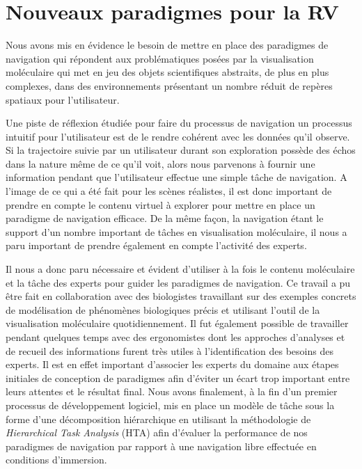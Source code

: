 \section{Nouveaux paradigmes pour la RV}

Nous avons mis en évidence le besoin de mettre en place des paradigmes de navigation qui répondent aux problématiques posées par la visualisation moléculaire qui met en jeu des objets scientifiques abstraits, de plus en plus complexes, dans des environnements présentant un nombre réduit de repères spatiaux pour l'utilisateur.

Une piste de réflexion étudiée pour faire du processus de navigation un processus intuitif pour l'utilisateur est de le rendre cohérent avec les données qu'il observe. Si la trajectoire suivie par un utilisateur durant son exploration possède des échos dans la nature même de ce qu'il voit, alors nous parvenons à fournir une information pendant que l'utilisateur effectue une simple tâche de navigation. A l'image de ce qui a été fait pour les scènes réalistes, il est donc important de prendre en compte le contenu virtuel à explorer pour mettre en place un paradigme de navigation efficace. De la même façon, la navigation étant le support d'un nombre important de tâches en visualisation moléculaire, il nous a paru important de prendre également en compte l'activité des experts. 

Il nous a donc paru nécessaire et évident d'utiliser à la fois le contenu moléculaire et la tâche des experts pour guider les paradigmes de navigation. Ce travail a pu être fait en collaboration avec des biologistes travaillant sur des exemples concrets de modélisation de phénomènes biologiques précis et utilisant l'outil de la visualisation moléculaire quotidiennement. Il fut également possible de travailler pendant quelques temps avec des ergonomistes dont les approches d'analyses et de recueil des informations furent très utiles à l'identification des besoins des experts. Il est en effet important d'associer les experts du domaine aux étapes initiales de conception de paradigmes afin d'éviter un écart trop important entre leurs attentes et le résultat final.
Nous avons finalement, à la fin d'un premier processus de développement logiciel, mis en place un modèle de tâche sous la forme d'une décomposition hiérarchique en utilisant la méthodologie de \textit{Hierarchical Task Analysis} (HTA) afin d'évaluer la performance de nos paradigmes de navigation par rapport à une navigation libre effectuée en conditions d'immersion.

